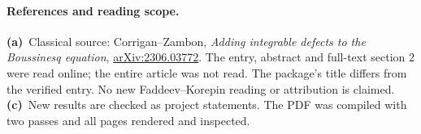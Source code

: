 \documentclass[11pt,a4paper]{article}
\newcommand{\La}{\textbf{(a)}\ }
\newcommand{\Lc}{\textbf{(c)}\ }
\newcommand{\file}[1]{\texttt{\detokenize{#1}}}
\begin{document}
\paragraph{References and reading scope.}
\La Classical source: Corrigan--Zambon,
\emph{Adding integrable defects to the Boussinesq equation},
\href{https://arxiv.org/abs/2306.03772}{arXiv:2306.03772}.
The entry, abstract and full-text section 2 were read online; the entire
article was not read. The package's title differs from the verified entry.
No new Faddeev--Korepin reading or attribution is claimed.
\Lc New results are checked as project statements. The PDF was compiled
with two \file{pdflatex} passes and all pages rendered and inspected.
\end{document}
